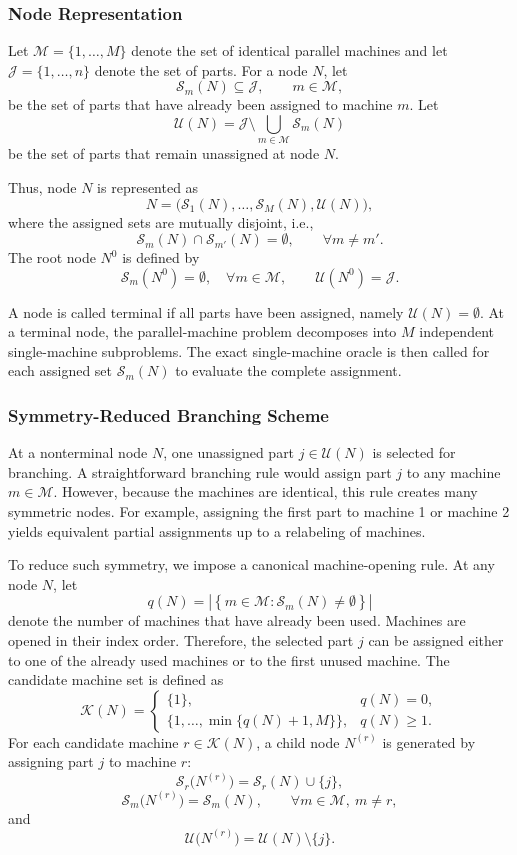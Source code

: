 \documentclass[review,3p,times,authoryear]{elsarticle}
\begin{document}
\subsubsection{Node Representation}

Let $\mathcal{M}=\{1,\dots,M\}$ denote the set of identical parallel machines
and let $\mathcal{J}=\{1,\dots,n\}$ denote the set of parts. For a node $N$,
let
\[
\mathcal{S}_m(N)\subseteq \mathcal{J}, \qquad m\in\mathcal{M},
\]
be the set of parts that have already been assigned to machine $m$. Let
\[
\mathcal{U}(N)=\mathcal{J}\setminus
\bigcup_{m\in\mathcal{M}}\mathcal{S}_m(N)
\]
be the set of parts that remain unassigned at node $N$.

Thus, node $N$ is represented as
\[
N=
\bigl(
\mathcal{S}_1(N),\dots,\mathcal{S}_M(N),\mathcal{U}(N)
\bigr),
\]
where the assigned sets are mutually disjoint, i.e.,
\[
\mathcal{S}_m(N)\cap \mathcal{S}_{m'}(N)=\emptyset,
\qquad \forall m\neq m'.
\]
The root node $N^0$ is defined by
\[
\mathcal{S}_m(N^0)=\emptyset,\quad \forall m\in\mathcal{M},
\qquad
\mathcal{U}(N^0)=\mathcal{J}.
\]

A node is called terminal if all parts have been assigned, namely
$\mathcal{U}(N)=\emptyset$. At a terminal node, the parallel-machine problem
decomposes into $M$ independent single-machine subproblems. The exact
single-machine oracle is then called for each assigned set
$\mathcal{S}_m(N)$ to evaluate the complete assignment.

\subsubsection{Symmetry-Reduced Branching Scheme}

At a nonterminal node $N$, one unassigned part $j\in\mathcal{U}(N)$ is
selected for branching. A straightforward branching rule would assign part
$j$ to any machine $m\in\mathcal{M}$. However, because the machines are
identical, this rule creates many symmetric nodes. For example, assigning
the first part to machine 1 or machine 2 yields equivalent partial
assignments up to a relabeling of machines.

To reduce such symmetry, we impose a canonical machine-opening rule. At any
node $N$, let
\[
q(N)=
\left|
\left\{
m\in\mathcal{M}:\mathcal{S}_m(N)\neq\emptyset
\right\}
\right|
\]
denote the number of machines that have already been used. Machines are
opened in their index order. Therefore, the selected part $j$ can be
assigned either to one of the already used machines or to the first unused
machine. The candidate machine set is defined as
\[
\mathcal{K}(N)=
\begin{cases}
	\{1\}, & q(N)=0,\\[2mm]
	\{1,\dots,\min\{q(N)+1,M\}\}, & q(N)\ge 1.
\end{cases}
\]
For each candidate machine $r\in\mathcal{K}(N)$, a child node $N^{(r)}$ is
generated by assigning part $j$ to machine $r$:
\[
\mathcal{S}_r\bigl(N^{(r)}\bigr)
=
\mathcal{S}_r(N)\cup\{j\},
\]
\[
\mathcal{S}_m\bigl(N^{(r)}\bigr)
=
\mathcal{S}_m(N),
\qquad \forall m\in\mathcal{M},\ m\neq r,
\]
and
\[
\mathcal{U}\bigl(N^{(r)}\bigr)
=
\mathcal{U}(N)\setminus\{j\}.
\]
\end{document}

